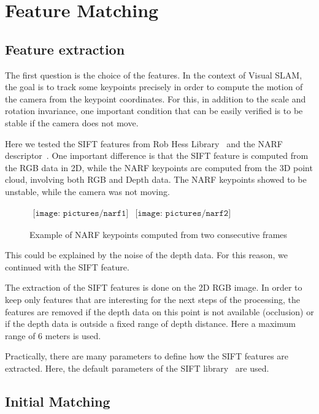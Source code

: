 \chapter{Feature Matching}
\label{chap:features}

\section{Feature extraction}

The first question is the choice of the features. In the context of Visual SLAM, the goal is to track some keypoints precisely in order to compute the motion of the camera from the keypoint coordinates. For this, in addition to the scale and rotation invariance, one important condition that can be easily verified is to be stable if the camera does not move. 

Here we tested the SIFT features from Rob Hess Library~\cite{hess_sift} and the NARF descriptor~\cite{steder10irosws}. One important difference is that the SIFT feature is computed from the RGB data in 2D, while the NARF keypoints are computed from the 3D point cloud, involving both RGB and Depth data.
The NARF keypoints showed to be unstable, while the camera was not moving.

\begin{figure}[h!]
\centering$
\begin{array}{cc}
\texttt{[image: pictures/narf1]} &
\texttt{[image: pictures/narf2]}
\end{array}$
\caption{Example of NARF keypoints computed from two consecutive frames}
\end{figure}

This could be explained by the noise of the depth data. For this reason, we continued with the SIFT feature.

The extraction of the SIFT features is done on the 2D RGB image. In order to keep only features that are interesting for the next steps of the processing, the features are removed if the depth data on this point is not available (occlusion) or if the depth data is outside a fixed range of depth distance. Here a maximum range of 6 meters is used.

Practically, there are many parameters to define how the SIFT features are extracted. Here, the default parameters of the SIFT library~\cite{hess_sift} are used.

\section{Initial Matching}

